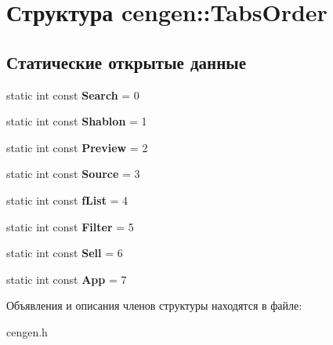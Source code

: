 \hypertarget{structcengen_1_1_tabs_order}{\section{Структура cengen\-:\-:\-Tabs\-Order}
\label{structcengen_1_1_tabs_order}
}
\subsection*{Статические открытые данные}
\begin{DoxyCompactItemize}
\item 
\hypertarget{structcengen_1_1_tabs_order_a76f2de74db1d0381d9a33eaf11548589}{static int const {\bfseries \-Search} = 0}\label{structcengen_1_1_tabs_order_a76f2de74db1d0381d9a33eaf11548589}

\item 
\hypertarget{structcengen_1_1_tabs_order_ad9d63274c0d5fb3f8828c7026cf25519}{static int const {\bfseries \-Shablon} = 1}\label{structcengen_1_1_tabs_order_ad9d63274c0d5fb3f8828c7026cf25519}

\item 
\hypertarget{structcengen_1_1_tabs_order_a0fe1d87159c8d8e9b5522deb2fcf3527}{static int const {\bfseries \-Preview} = 2}\label{structcengen_1_1_tabs_order_a0fe1d87159c8d8e9b5522deb2fcf3527}

\item 
\hypertarget{structcengen_1_1_tabs_order_a6f9eec38429b5a356987abd2cc6c1040}{static int const {\bfseries \-Source} = 3}\label{structcengen_1_1_tabs_order_a6f9eec38429b5a356987abd2cc6c1040}

\item 
\hypertarget{structcengen_1_1_tabs_order_aae190c98393145a70ad691527de89c01}{static int const {\bfseries f\-List} = 4}\label{structcengen_1_1_tabs_order_aae190c98393145a70ad691527de89c01}

\item 
\hypertarget{structcengen_1_1_tabs_order_a39a7629eed2637e631ae814ccec6ac79}{static int const {\bfseries \-Filter} = 5}\label{structcengen_1_1_tabs_order_a39a7629eed2637e631ae814ccec6ac79}

\item 
\hypertarget{structcengen_1_1_tabs_order_ad0fba7f4ac6e8d3c2e8447e00e33f720}{static int const {\bfseries \-Sell} = 6}\label{structcengen_1_1_tabs_order_ad0fba7f4ac6e8d3c2e8447e00e33f720}

\item 
\hypertarget{structcengen_1_1_tabs_order_a77e8e5d184dd916b80d466c19723bac7}{static int const {\bfseries \-App} = 7}\label{structcengen_1_1_tabs_order_a77e8e5d184dd916b80d466c19723bac7}

\end{DoxyCompactItemize}


Объявления и описания членов структуры находятся в файле\-:\begin{DoxyCompactItemize}
\item 
cengen.\-h\end{DoxyCompactItemize}
